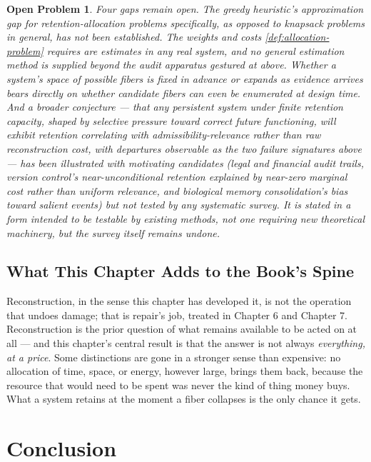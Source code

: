 \documentclass[12pt]{report}
\newtheorem{openproblem}[definition]{Open Problem}
\begin{document}
\begin{openproblem}
\label{prob:allocation-open}
Four gaps remain open. The greedy heuristic's approximation gap for
retention-allocation problems specifically, as opposed to knapsack
problems in general, has not been established. The weights and costs
\cref{def:allocation-problem} requires are estimates in any real system,
and no general estimation method is supplied beyond the audit apparatus
gestured at above. Whether a system's space of possible fibers is fixed
in advance or expands as evidence arrives bears directly on whether
candidate fibers can even be enumerated at design time. And a broader
conjecture --- that any persistent system under finite retention
capacity, shaped by selective pressure toward correct future
functioning, will exhibit retention correlating with
admissibility-relevance rather than raw reconstruction cost, with
departures observable as the two failure signatures above --- has been
illustrated with motivating candidates (legal and financial audit
trails, version control's near-unconditional retention explained by
near-zero marginal cost rather than uniform relevance, and biological
memory consolidation's bias toward salient events) but not tested by
any systematic survey. It is stated in a form intended to be testable by
existing methods, not one requiring new theoretical machinery, but the
survey itself remains undone.
\end{openproblem}

\section*{What This Chapter Adds to the Book's Spine}

Reconstruction, in the sense this chapter has developed it, is not the
operation that undoes damage; that is repair's job, treated in Chapter 6
and Chapter 7. Reconstruction is the prior question of what remains
available to be acted on at all --- and this chapter's central result is
that the answer is not always \emph{everything, at a price}. Some
distinctions are gone in a stronger sense than expensive: no
allocation of time, space, or energy, however large, brings them back,
because the resource that would need to be spent was never the kind of
thing money buys. What a system retains at the moment a fiber collapses
is the only chance it gets.

\chapter*{Conclusion}
\end{document}
